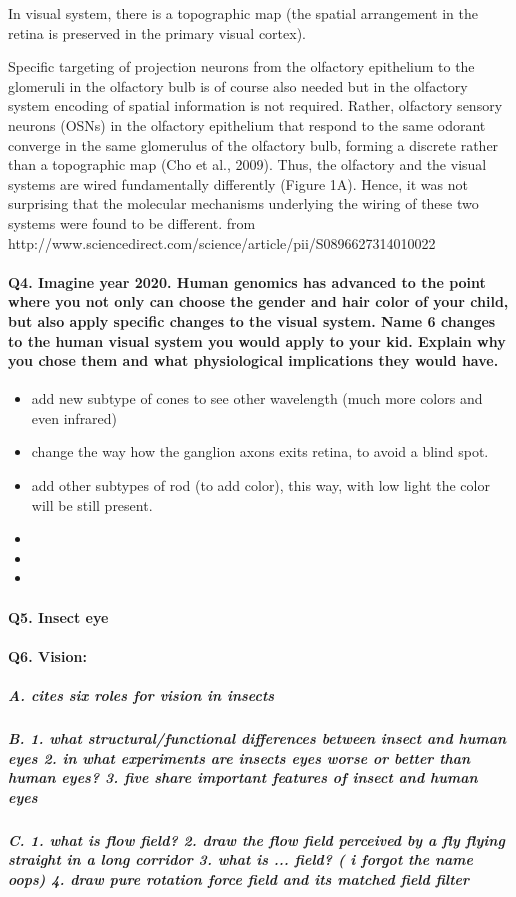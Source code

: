 \documentclass[12pt,article,oneside,a4paper]{memoir}
\begin{document}
In visual system, there is a topographic map (the spatial arrangement in the retina is preserved in the primary visual cortex).

Specific targeting of projection neurons from the olfactory epithelium to the glomeruli
in the olfactory bulb is of course also needed but in the olfactory system encoding of
spatial information is not required. Rather, olfactory sensory neurons (OSNs) in the
olfactory epithelium that respond to the same odorant converge in the same
glomerulus of the olfactory bulb, forming a discrete rather than a topographic map
(Cho et al., 2009). Thus, the olfactory and the visual systems are wired
fundamentally differently (Figure 1A). Hence, it was not surprising that the molecular
mechanisms underlying the wiring of these two systems were found to be different.
from http://www.sciencedirect.com/science/article/pii/S0896627314010022

\paragraph{Q4. Imagine year 2020. Human genomics has advanced to the point where you
not only can choose the gender and hair color of your child, but also apply specific
changes to the visual system. Name 6 changes to the human visual system you would apply to your kid. Explain why you chose them and what physiological implications they would have.}

\begin{itemize}
\item add new subtype of cones to see other wavelength (much more colors and even infrared)
\item change the way how the ganglion axons exits retina, to avoid a blind spot.
\item add other subtypes of rod (to add color), this way, with low light the color will be still present.
\item 
\item
\item
\end{itemize}

\paragraph{Q5. Insect eye} 

\paragraph{Q6. Vision:}
\subparagraph{A. cites six roles for vision in insects}
\subparagraph{B. 1. what structural/functional differences between insect and human eyes 2. in what experiments are insects eyes worse or better than human eyes? 3. five share important features of insect and human eyes}
\subparagraph{C. 1. what is flow field? 2. draw the flow field perceived by a fly flying straight in a long corridor 3. what is ... field? ( i forgot the name oops) 4. draw pure rotation force field and its matched field filter}
\end{document}
